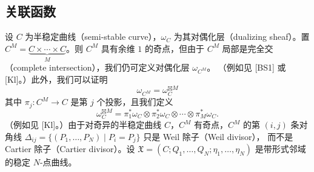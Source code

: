 
\subsection{关联函数}

设 $C$ 为半稳定曲线（semi-stable curve），$\omega_C$ 为其对偶化层（dualizing sheaf）。置
$C^M=\underbrace{C\times\cdots\times C}_{M}$。则 $C^M$ 具有余维 $1$ 的奇点，但由于 $C^M$
局部是完全交（complete intersection），我们仍可定义对偶化层 $\omega_{C^M}$。
（例如见 [BS1] 或 [Kl]。）此外，我们可以证明
\[
  \omega_{C^M} = \omega_C^{\boxtimes M}
\]
其中 $\pi_j : C^M \to C$ 是第 $j$ 个投影，且我们定义
\[
  \omega_C^{\boxtimes M} = \pi_1^*\omega_C \otimes \pi_2^*\omega_C
  \otimes \cdots \otimes \pi_M^*\omega_C .
\]
%
（例如见 [Kl]。）由于对奇异的半稳定曲线 $C$，$C^M$ 有奇点，$C^M$ 的第 $(i,j)$ 条对角线
$\Delta_{ij}=\{(P_1,\dots,P_N)\mid P_i=P_j\}$ 只是 Weil 除子（Weil divisor），
而不是 Cartier 除子（Cartier divisor）。设
$\mathfrak{X}=(C;Q_1,\dots,Q_N;\eta_1,\dots,\eta_N)$ 是带形式邻域的稳定 $N$-点曲线。
%

